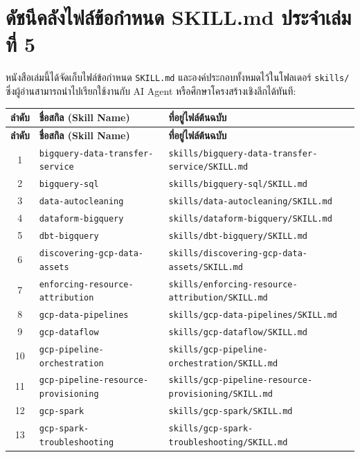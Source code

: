 \section{ดัชนีคลังไฟล์ข้อกำหนด SKILL.md ประจำเล่มที่ 5}

หนังสือเล่มนี้ได้จัดเก็บไฟล์ข้อกำหนด \texttt{SKILL.md} และองค์ประกอบทั้งหมดไว้ในโฟลเดอร์ \texttt{skills/} ซึ่งผู้อ่านสามารถนำไปเรียกใช้งานกับ AI Agent หรือศึกษาโครงสร้างเชิงลึกได้ทันที:

\small
\begin{longtable}{|c|p{}|p{}|}
\hline
\textbf{ลำดับ} & \textbf{ชื่อสกิล (Skill Name)} & \textbf{ที่อยู่ไฟล์ต้นฉบับ} \\ \hline
\endfirsthead
\hline
\textbf{ลำดับ} & \textbf{ชื่อสกิล (Skill Name)} & \textbf{ที่อยู่ไฟล์ต้นฉบับ} \\ \hline
\endhead
1 & \texttt{bigquery-data-transfer-service} & \texttt{skills/bigquery-data-transfer-service/SKILL.md} \\ \hline
2 & \texttt{bigquery-sql} & \texttt{skills/bigquery-sql/SKILL.md} \\ \hline
3 & \texttt{data-autocleaning} & \texttt{skills/data-autocleaning/SKILL.md} \\ \hline
4 & \texttt{dataform-bigquery} & \texttt{skills/dataform-bigquery/SKILL.md} \\ \hline
5 & \texttt{dbt-bigquery} & \texttt{skills/dbt-bigquery/SKILL.md} \\ \hline
6 & \texttt{discovering-gcp-data-assets} & \texttt{skills/discovering-gcp-data-assets/SKILL.md} \\ \hline
7 & \texttt{enforcing-resource-attribution} & \texttt{skills/enforcing-resource-attribution/SKILL.md} \\ \hline
8 & \texttt{gcp-data-pipelines} & \texttt{skills/gcp-data-pipelines/SKILL.md} \\ \hline
9 & \texttt{gcp-dataflow} & \texttt{skills/gcp-dataflow/SKILL.md} \\ \hline
10 & \texttt{gcp-pipeline-orchestration} & \texttt{skills/gcp-pipeline-orchestration/SKILL.md} \\ \hline
11 & \texttt{gcp-pipeline-resource-provisioning} & \texttt{skills/gcp-pipeline-resource-provisioning/SKILL.md} \\ \hline
12 & \texttt{gcp-spark} & \texttt{skills/gcp-spark/SKILL.md} \\ \hline
13 & \texttt{gcp-spark-troubleshooting} & \texttt{skills/gcp-spark-troubleshooting/SKILL.md} \\ \hline

\end{longtable}

